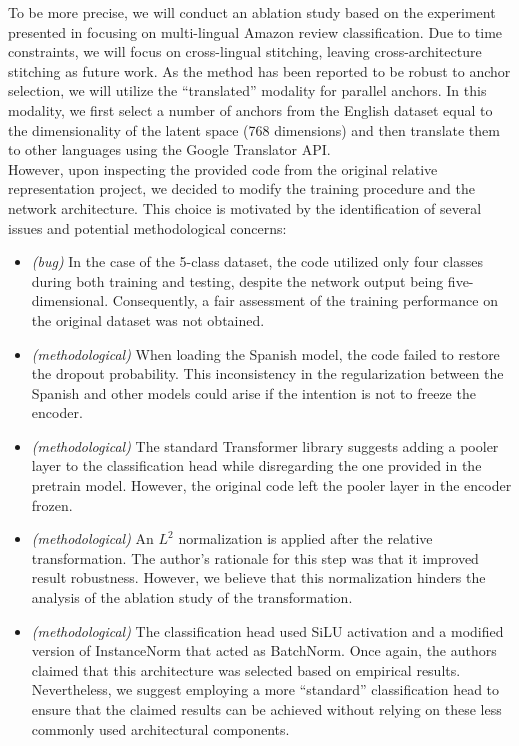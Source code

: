 \documentclass[../main.tex]{subfiles}
\begin{document}
To be more precise, we will conduct an ablation study based on the experiment presented in \cite{moschella_relative_2022} focusing on multi-lingual Amazon review classification. Due to time constraints, we will focus on cross-lingual stitching, leaving cross-architecture stitching as future work. As the method has been reported to be robust to anchor selection, we will utilize the ``translated'' modality for parallel anchors. In this modality, we first select a number of anchors from the English dataset equal to the dimensionality of the latent space (768 dimensions) and then translate them to other languages using the Google Translator API.\\

However, upon inspecting the provided code from the original relative representation project, we decided to modify the training procedure and the network architecture. This choice is motivated by the identification of several issues and potential methodological concerns:

\begin{itemize}
\item \textit{(bug)} In the case of the 5-class dataset, the code utilized only four classes during both training and testing, despite the network output being five-dimensional. Consequently, a fair assessment of the training performance on the original dataset was not obtained.

\item \textit{(methodological)} When loading the Spanish model, the code failed to restore the dropout probability. This inconsistency in the regularization between the Spanish and other models could arise if the intention is not to freeze the encoder.

\item \textit{(methodological)} The standard Transformer library suggests adding a pooler layer to the classification head while disregarding the one provided in the pretrain model. However, the original code left the pooler layer in the encoder frozen.

\item \textit{(methodological)} An $L^2$ normalization is applied after the relative transformation. The author's rationale for this step was that it improved result robustness. However, we believe that this normalization hinders the analysis of the ablation study of the transformation.

\item \textit{(methodological)} The classification head used SiLU activation and a modified version of InstanceNorm that acted as BatchNorm. Once again, the authors claimed that this architecture was selected based on empirical results. Nevertheless, we suggest employing a more ``standard'' classification head to ensure that the claimed results can be achieved without relying on these less commonly used architectural components.
\end{itemize}
\end{document}
